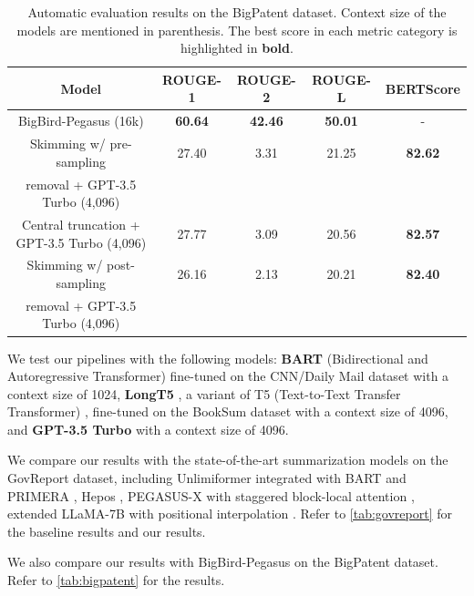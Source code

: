 	\begin{table}[!ht]
		\centering

		\begin{tabular}{c c c c c}
			\hline
			Model & ROUGE-1 & ROUGE-2 & ROUGE-L & BERTScore \\
			\hline
			BigBird-Pegasus (16k) & \textbf{60.64} & \textbf{42.46} & \textbf{50.01} & - \\
			\hline
			Skimming w/ pre-sampling & 27.40 & 3.31 & 21.25 & \textbf{82.62} \\
			removal + GPT-3.5 Turbo (4,096) & & & & \\
			Central truncation + GPT-3.5 Turbo (4,096) & 27.77 & 3.09 & 20.56 & \textbf{82.57} \\
			Skimming w/ post-sampling & 26.16 & 2.13 & 20.21 & \textbf{82.40} \\
			removal + GPT-3.5 Turbo (4,096) & & & & \\
			\hline
		\end{tabular}

		\caption{Automatic evaluation results on the BigPatent dataset. Context size of
		the models are mentioned in parenthesis. The best score in each metric category
		is highlighted in \textbf{bold}.}
		\label{tab:bigpatent}
	\end{table}

	We test our pipelines with the following models: \textbf{BART} (Bidirectional
	and Autoregressive Transformer) \cite{lewis-etal-2020-bart} fine-tuned on the
	CNN/Daily Mail dataset \cite{nallapati2016abstractive} with a context size of 1024,
	\textbf{LongT5} \cite{guo2021longt5}, a variant of T5 (Text-to-Text Transfer
	Transformer) \cite{raffel2020exploring}, fine-tuned on the BookSum dataset with
	a context size of 4096, and \textbf{GPT-3.5 Turbo} \cite{brown2020language} with a
	context size of 4096.

	We compare our results with the state-of-the-art summarization models on the GovReport dataset,
	including Unlimiformer \cite{bertsch2023unlimiformer} integrated with BART
	\cite{lewis-etal-2020-bart} and PRIMERA \cite{beltagy2020longformer}, Hepos
	\cite{huang-etal-2021-efficient}, PEGASUS-X with staggered block-local attention
	\cite{phang2022investigating}, extended	LLaMA-7B with positional interpolation
	\cite{chen2023extending}.
	Refer to \autoref{tab:govreport} for the baseline results and our results.

	We also compare our results with BigBird-Pegasus \cite{zaheer2020big} on the BigPatent dataset.
	Refer to \autoref{tab:bigpatent} for the results.


